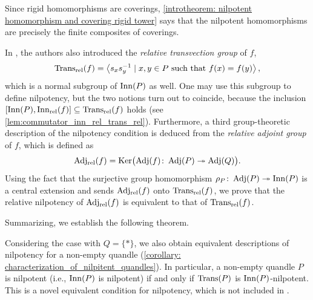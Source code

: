 Since rigid homomorphisms are coverings, \cref{introtheorem: nilpotent homomorphism and covering rigid tower} says that the nilpotent homomorphisms are precisely the finite composites of coverings.

In \cite{preprint_yuki_tomoki_2026_relativization_of_symmetries_on_quandles}, the authors also introduced the \emph{relative transvection group} of $f$,
\[ \operatorname{Trans_{rel}}(f) = \left\langle s_xs_y^{-1} \mid x,y \in P \text{ such that }f(x)=f(y) \right\rangle, \]
which is a normal subgroup of $\operatorname{Inn}(P)$ as well. One may use this subgroup to define nilpotency, but the two notions turn out to coincide, because the inclusion $[\operatorname{Inn}(P),\operatorname{Inn_{rel}}(f)] \subseteq \operatorname{Trans_{rel}}(f)$ holds (see \cref{lem:commutator_inn_rel_trans_rel}).
Furthermore, a third group-theoretic description of the nilpotency condition is deduced from the \emph{relative adjoint group} of $f$, which is defined as
\[ \operatorname{Adj_{rel}}(f)=\operatorname{Ker}\bigl(\operatorname{Adj}(f)\colon\operatorname{Adj}(P)\twoheadrightarrow\operatorname{Adj}(Q)\bigr). \]
Using the fact that the surjective group homomorphism $\rho_P \colon \operatorname{Adj}(P) \twoheadrightarrow\operatorname{Inn}(P)$ is a central extension and sends $\operatorname{Adj_{rel}}(f)$ onto $\operatorname{Trans_{rel}}(f)$, we prove that the relative nilpotency of $\operatorname{Adj_{rel}}(f)$ is equivalent to that of $\operatorname{Trans_{rel}}(f)$.
 
Summarizing, we establish the following theorem.


Considering the case with $Q=\{\ast\}$, we also obtain equivalent descriptions of nilpotency for a non-empty quandle (\cref{corollary: characterization_of_nilpitent_quandles}). In particular, a non-empty quandle $P$ is nilpotent (i.e., $\operatorname{Inn}(P)$ is nilpotent) if and only if $\operatorname{Trans}(P)$ is $\operatorname{Inn}(P)$-nilpotent.
This is a novel equivalent condition for nilpotency, which is not included in \cite[Corollary~2.5 and Theorem~2.13]{darne_2026_nilpotent_quandles}.

